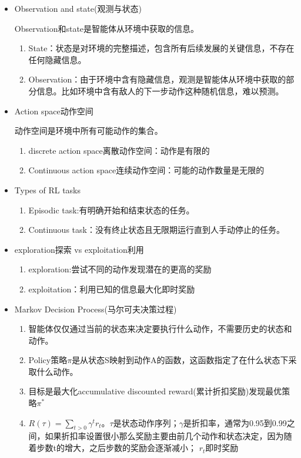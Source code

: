 \documentclass[UTF8]{ctexart}
\begin{document}
\begin{itemize}
    \item Observation and state(观测与状态)
    
    Observation和state是智能体从环境中获取的信息。
    \begin{enumerate}
        \item State：状态是对环境的完整描述，包含所有后续发展的关键信息，不存在任何隐藏信息。
        \item Observation：由于环境中含有隐藏信息，观测是智能体从环境中获取的部分信息。比如环境中含有敌人的下一步动作这种随机信息，难以预测。
    \end{enumerate}

    \item Action space动作空间
    
    动作空间是环境中所有可能动作的集合。

    \begin{enumerate}
        \item discrete action space离散动作空间：动作是有限的
        \item Continuous action space连续动作空间：可能的动作数量是无限的
    \end{enumerate}

    \item Types of RL tasks
    
    \begin{enumerate}
        \item Episodic task:有明确开始和结束状态的任务。
        \item Continuous task：没有终止状态且无限期运行直到人手动停止的任务。
    \end{enumerate}

    \item exploration探索 vs exploitation利用
    
    \begin{enumerate}
        \item exploration:尝试不同的动作发现潜在的更高的奖励
        \item exploitation：利用已知的信息最大化即时奖励
    \end{enumerate}

    \item Markov Decision Process(马尔可夫决策过程)
    \begin{enumerate}
        \item 智能体仅仅通过当前的状态来决定要执行什么动作，不需要历史的状态和动作。
        \item Policy策略$\pi$是从状态S映射到动作A的函数，这函数指定了在什么状态下采取什么动作。
        \item 目标是最大化accumulative discounted reward(累计折扣奖励)发现最优策略$\pi^{*}$
        \item $R(\tau )=\sum\limits_{t>0}\gamma ^{t}r_{t}$。$\tau$是状态动作序列；$\gamma$是折扣率，通常为0.95到0.99之间，如果折扣率设置很小那么奖励主要由前几个动作和状态决定，因为随着步数t的增大，之后步数的奖励会逐渐减小； $r_{t}$即时奖励
    \end{enumerate}


\end{itemize}
\end{document}
